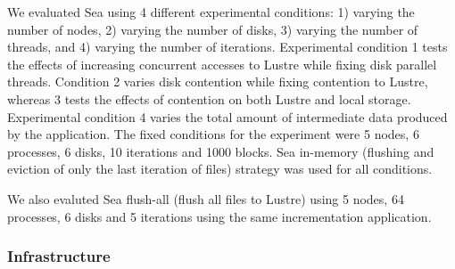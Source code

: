                                                                                    
      We evaluated Sea using 4 different experimental conditions: 1) varying the
      number of nodes, 2) varying the number of disks, 3) varying the number of
      threads, and 4) varying the number of iterations. Experimental condition 1
      tests the effects of increasing concurrent accesses to Lustre while fixing
      disk parallel threads. Condition 2 varies disk contention while fixing
      contention to Lustre, whereas 3 tests the effects of contention on both
      Lustre and local storage. Experimental condition 4 varies the total amount
      of intermediate data produced by the application. The fixed conditions for
      the experiment were 5 nodes, 6 processes, 6 disks, 10 iterations and 1000
      blocks. Sea in-memory (flushing and eviction of only the last iteration of
      files) strategy was used for all conditions.
      
      We also evaluted Sea flush-all (flush all files to Lustre) using 5 nodes,
      64 processes, 6 disks and 5 iterations using the same incrementation
      application.



\subsubsection{Infrastructure}

